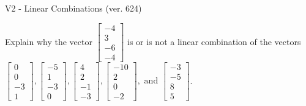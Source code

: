 \begin{exercise}
  \begin{exerciseTitle}V2 - Linear Combinations (ver. 624)\end{exerciseTitle}
  \begin{exerciseStatement}
    Explain why the vector \(\left[\begin{array}{c}
-4 \\
3 \\
-6 \\
-4
\end{array}\right]\)  is or is not a linear 
	combination of the vectors \(\left[\begin{array}{c}
0 \\
0 \\
-3 \\
1
\end{array}\right] , \left[\begin{array}{c}
-5 \\
1 \\
-3 \\
0
\end{array}\right] , \left[\begin{array}{c}
4 \\
2 \\
-1 \\
-3
\end{array}\right] , \left[\begin{array}{c}
-10 \\
2 \\
0 \\
-2
\end{array}\right] , \text{ and } \left[\begin{array}{c}
-3 \\
-5 \\
8 \\
5
\end{array}\right]\).
	



\end{exerciseStatement}
\end{exercise}

